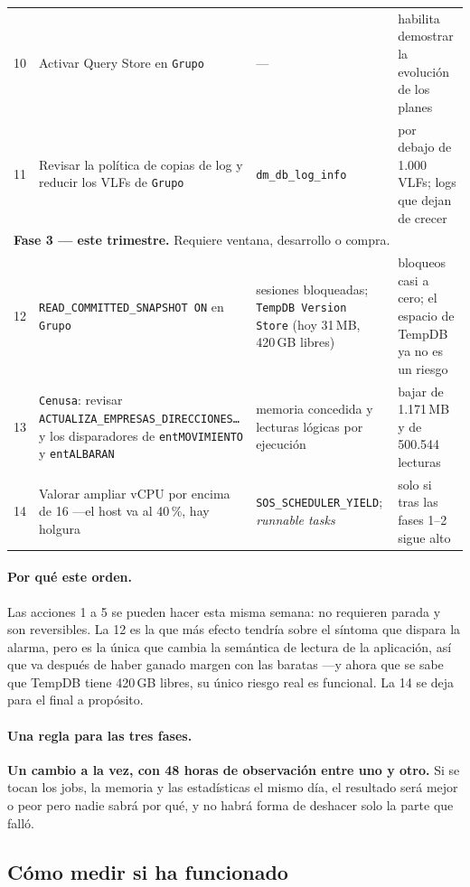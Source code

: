 \documentclass[11pt,a4paper]{article}
\newcommand{\cod}[1]{\texttt{\small #1}}
\begin{document}
\begin{longtable}{p{0.7cm}p{4.9cm}p{4.3cm}p{4.6cm}}
10 & Activar Query Store en \cod{Grupo}
  & ---
  & habilita demostrar la evolución de los planes \\
11 & Revisar la política de copias de log y reducir los VLFs de \cod{Grupo}
  & \cod{dm\_db\_log\_info}
  & por debajo de 1.000 VLFs; logs que dejan de crecer \\
\midrule
\multicolumn{4}{l}{\cellcolor{acento!10}\textbf{Fase 3 — este trimestre.}
Requiere ventana, desarrollo o compra.} \\
\midrule
12 & \cod{READ\_COMMITTED\_SNAPSHOT ON} en \cod{Grupo}
  & sesiones bloqueadas; \cod{TempDB Version Store} (hoy 31\,MB, 420\,GB
    libres)
  & bloqueos casi a cero; el espacio de TempDB ya no es un riesgo \\
13 & \cod{Cenusa}: revisar
     \cod{ACTUALIZA\_EMPRESAS\_DIRECCIONES\ldots} y los disparadores de
     \cod{entMOVIMIENTO} y \cod{entALBARAN}
  & memoria concedida y lecturas lógicas por ejecución
  & bajar de 1.171\,MB y de 500.544 lecturas \\
14 & Valorar ampliar vCPU por encima de 16 —el host va al 40\,\%, hay holgura
  & \cod{SOS\_SCHEDULER\_YIELD}; \emph{runnable tasks}
  & solo si tras las fases 1--2 sigue alto \\
\bottomrule
\end{longtable}

\paragraph{Por qué este orden.} Las acciones 1 a 5 se pueden hacer esta misma
semana: no requieren parada y son reversibles. La 12 es la que más efecto
tendría sobre el síntoma que dispara la alarma, pero es la única que cambia
la semántica de lectura de la aplicación, así que va después de haber ganado
margen con las baratas —y ahora que se sabe que TempDB tiene 420\,GB libres,
su único riesgo real es funcional. La 14 se deja para el final a propósito.

\paragraph{Una regla para las tres fases.} \textbf{Un cambio a la vez, con 48
horas de observación entre uno y otro.} Si se tocan los jobs, la memoria y
las estadísticas el mismo día, el resultado será mejor o peor pero nadie
sabrá por qué, y no habrá forma de deshacer solo la parte que falló.

\subsection{Cómo medir si ha funcionado}
\end{document}
